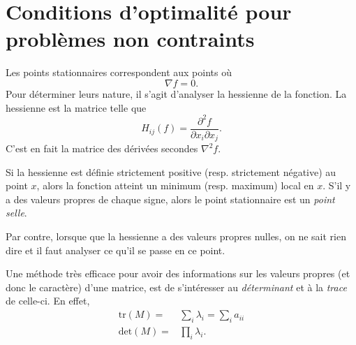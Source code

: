 \section{Conditions d'optimalité pour problèmes non contraints}
\label{sec:nonlinApe1}

Les points stationnaires correspondent aux points où 
\[\nabla f = 0.\]
Pour déterminer leurs nature, il s'agit d'analyser la hessienne de la fonction.
La hessienne est la matrice telle que
\[H_{ij}(f) = \frac{\partial^2 f}{\partial x_i \partial x_j}.\]
C'est en fait la matrice des dérivées secondes $\nabla^2 f$.

Si la hessienne est définie strictement positive
(resp. strictement négative) au point $x$, 
alors la fonction atteint un minimum (resp. maximum) local en $x$.
S'il y a des valeurs propres de chaque signe, 
alors le point stationnaire est un \emph{point selle}.

Par contre, lorsque que la hessienne a des valeurs propres nulles,
on ne sait rien dire et il faut analyser ce qu'il se passe en ce point.

Une méthode très efficace pour avoir des informations 
sur les valeurs propres (et donc le caractère) d'une matrice, 
est de s'intéresser au \emph{déterminant} et à la \emph{trace} de celle-ci.
En effet, 
\begin{align*}
  \text{tr}(M) =& \sum_i \lambda_i = \sum_i a_{ii} \\
  \text{det}(M) =& \prod_i \lambda_i.
\end{align*}

\newpage
  
